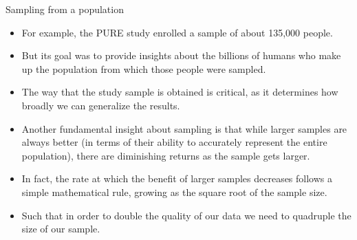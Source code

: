 \documentclass[handout]{beamer}
\begin{document}
\begin{frame}{Sampling from a population}

\scriptsize{
\begin{itemize}
\item For example, the PURE study enrolled a sample of about 135,000 people.
\item But its goal was to provide insights about the billions of humans who make up the population from which those people were sampled. 
\item The way that the study sample is obtained is critical, as it determines how broadly we can generalize the results.
\item Another fundamental insight about sampling is that while larger samples are always better (in terms of their ability to accurately represent the entire population), there are diminishing returns as the sample gets larger. 

\item In fact, the rate at which the benefit of larger samples decreases follows a simple mathematical rule, growing as the square root of the sample size.
\item Such that in order to double the quality of our data we need to quadruple the size of our sample.
\end{itemize}

}

 
\end{frame}
\end{document}
